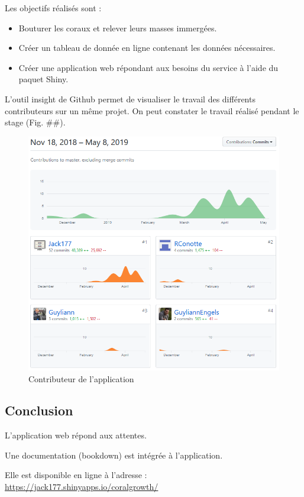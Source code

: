 \documentclass[]{report}
\begin{document}
Les objectifs réalisés sont :

\begin{itemize}
\item
  Bouturer les coraux et relever leurs masses immergées.
\item
  Créer un tableau de donnée en ligne contenant les données nécessaires.
\item
  Créer une application web répondant aux besoins du service à l'aide du
  paquet Shiny.
\end{itemize}

L'outil insight de Github permet de visualiser le travail des différents
contributeurs sur un même projet. On peut constater le travail réalisé
pendant le stage (Fig. \#\#).

\begin{figure}
\centering
\includegraphics{../image/github.PNG}
\caption{Contributeur de l'application}
\end{figure}

\subsection{Conclusion}\label{conclusion}

L'application web répond aux attentes.

Une documentation (bookdown) est intégrée à l'application.

Elle est disponible en ligne à l'adresse :
\url{https://jack177.shinyapps.io/coralgrowth/}
\end{document}
